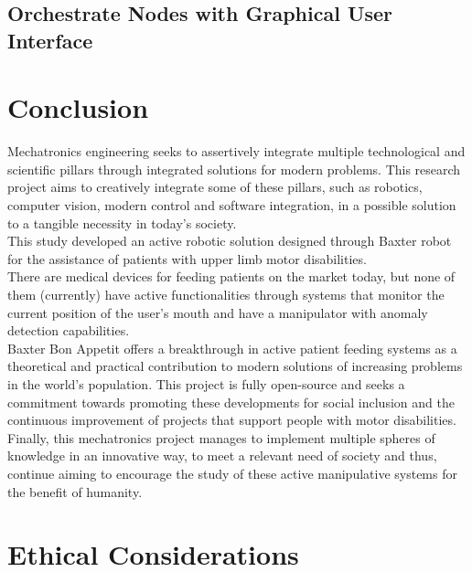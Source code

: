 \documentclass[11pt]{report} %
\begin{document}
\section{Orchestrate Nodes with Graphical User Interface} \label{ref_gui_section}


\chapter{Conclusion}

Mechatronics engineering seeks to assertively integrate multiple technological and scientific pillars through integrated solutions for modern problems. This research project aims to creatively integrate some of these pillars, such as robotics, computer vision, modern control and software integration, in a possible solution to a tangible necessity in today's society.\\

This study developed an active robotic solution designed through Baxter robot for the assistance of patients with upper limb motor disabilities.\\

There are medical devices for feeding patients on the market today, but none of them (currently) have active functionalities through systems that monitor the current position of the user's mouth and have a manipulator with anomaly detection capabilities.\\

Baxter Bon Appetit offers a breakthrough in active patient feeding systems as a theoretical and practical contribution to modern solutions of increasing problems in the world's population. This project is fully open-source and seeks a commitment towards promoting these developments for social inclusion and the continuous improvement of projects that support people with motor disabilities.\\

Finally, this mechatronics project manages to implement multiple spheres of knowledge in an innovative way, to meet a relevant need of society and thus, continue aiming to encourage the study of these active manipulative systems for the benefit of humanity.\\


\chapter{Ethical Considerations}
\end{document}
